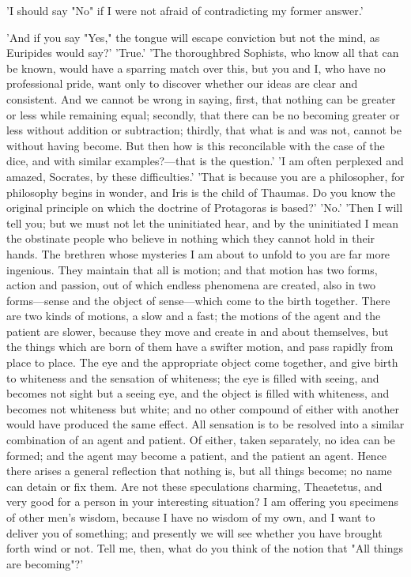 \documentclass[11pt,letter]{article}
\begin{document}
\par  'I should say "No" if I were not afraid of contradicting my former answer.'

\par  'And if you say "Yes," the tongue will escape conviction but not the mind, as Euripides would say?' 'True.' 'The thoroughbred Sophists, who know all that can be known, would have a sparring match over this, but you and I, who have no professional pride, want only to discover whether our ideas are clear and consistent. And we cannot be wrong in saying, first, that nothing can be greater or less while remaining equal; secondly, that there can be no becoming greater or less without addition or subtraction; thirdly, that what is and was not, cannot be without having become. But then how is this reconcilable with the case of the dice, and with similar examples?—that is the question.' 'I am often perplexed and amazed, Socrates, by these difficulties.' 'That is because you are a philosopher, for philosophy begins in wonder, and Iris is the child of Thaumas. Do you know the original principle on which the doctrine of Protagoras is based?' 'No.' 'Then I will tell you; but we must not let the uninitiated hear, and by the uninitiated I mean the obstinate people who believe in nothing which they cannot hold in their hands. The brethren whose mysteries I am about to unfold to you are far more ingenious. They maintain that all is motion; and that motion has two forms, action and passion, out of which endless phenomena are created, also in two forms—sense and the object of sense—which come to the birth together. There are two kinds of motions, a slow and a fast; the motions of the agent and the patient are slower, because they move and create in and about themselves, but the things which are born of them have a swifter motion, and pass rapidly from place to place. The eye and the appropriate object come together, and give birth to whiteness and the sensation of whiteness; the eye is filled with seeing, and becomes not sight but a seeing eye, and the object is filled with whiteness, and becomes not whiteness but white; and no other compound of either with another would have produced the same effect. All sensation is to be resolved into a similar combination of an agent and patient. Of either, taken separately, no idea can be formed; and the agent may become a patient, and the patient an agent. Hence there arises a general reflection that nothing is, but all things become; no name can detain or fix them. Are not these speculations charming, Theaetetus, and very good for a person in your interesting situation? I am offering you specimens of other men's wisdom, because I have no wisdom of my own, and I want to deliver you of something; and presently we will see whether you have brought forth wind or not. Tell me, then, what do you think of the notion that "All things are becoming"?'
\end{document}
